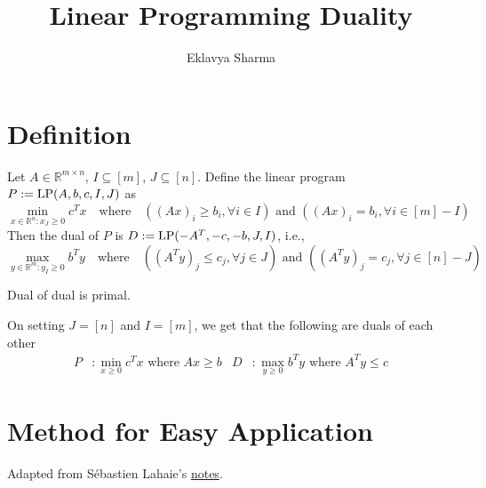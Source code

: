 \documentclass[a4paper,12pt,fleqn]{article}
\author{Eklavya Sharma}
\date{\empty}
\title{Linear Programming Duality}
\DeclareMathOperator{\LP}{LP}
\begin{document}
\maketitle
\setlength{\parskip}{0.2em}

\section{Definition}

Let $A \in \mathbb{R}^{m \times n}$, $I \subseteq [m]$, $J \subseteq [n]$.
Define the linear program $P \defeq \LP(A, b, c, I, J)$ as
\[ \min_{x \in \mathbb{R}^n: x_J \ge 0} c^Tx \quad\textrm{where}\quad
((Ax)_i \ge b_i, \forall i \in I) \textrm{ and } ((Ax)_i = b_i, \forall i \in [m]-I) \]
Then the dual of $P$ is $D \defeq \LP(-A^T, -c, -b, J, I)$, i.e.,
\[ \max_{y \in \mathbb{R}^m: y_I \ge 0} b^Ty \quad\textrm{where}\quad
((A^Ty)_j \le c_j, \forall j \in J) \textrm{ and } ((A^Ty)_j = c_j, \forall j \in [n]-J) \]

\begin{lemma}
Dual of dual is primal.
\end{lemma}

On setting $J = [n]$ and $I = [m]$, we get that the
following are duals of each other
\begin{align*}
P &: \min_{x \ge 0} c^Tx \textrm{ where } Ax \ge b
& D&: \max_{y \ge 0} b^Ty \textrm{ where } A^Ty \le c
\end{align*}

\section{Method for Easy Application}

Adapted from S\'ebastien Lahaie's \href{http://www.cs.columbia.edu/coms6998-3/lpprimer.pdf}{notes}.
\end{document}
